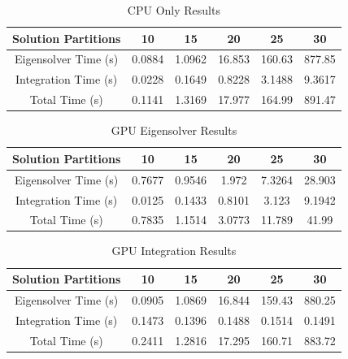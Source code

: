 \documentclass[conference, twoside]{IEEEtran}
\begin{document}

\begin{table}
    \renewcommand{\arraystretch}{1.3} %
    \caption{CPU Only Results}
    \label{cpu-only-results}
    \centering
    \begin{tabular}{c||c|c|c|c|c}
        \hline
        {Solution Partitions} & {10} & {15} & {20} & {25} & {30} \\
        \hline
        \hline
        {Eigensolver Time (s)}              & {0.0884} & {1.0962} & {16.853} & {160.63} & {877.85}\\
        {Integration Time (s)}              & {0.0228} & {0.1649} & {0.8228} & {3.1488} & {9.3617}\\
        {Total Time (s)}                    & {0.1141} & {1.3169} & {17.977} & {164.99} & {891.47}\\
        \hline
    \end{tabular}
\end{table}

\begin{table}
    \renewcommand{\arraystretch}{1.3} %
    \caption{GPU Eigensolver Results}
    \label{gpu-eigensolver-results}
    \centering
    \begin{tabular}{c||c|c|c|c|c}
        \hline
        {Solution Partitions} & {10} & {15} & {20} & {25} & {30} \\
        \hline
        \hline
        {Eigensolver Time (s)}              & {0.7677} & {0.9546} & {1.972}  & {7.3264} & {28.903}\\
        {Integration Time (s)}              & {0.0125} & {0.1433} & {0.8101} & {3.123}  & {9.1942}\\
        {Total Time (s)}                    & {0.7835} & {1.1514} & {3.0773} & {11.789} & {41.99} \\
        \hline
    \end{tabular}
\end{table}

\begin{table}
    \renewcommand{\arraystretch}{1.3} %
    \caption{GPU Integration Results}
    \label{gpu-integration-results}
    \centering
    \begin{tabular}{c||c|c|c|c|c}
        \hline
        {Solution Partitions} & {10} & {15} & {20} & {25} & {30} \\
        \hline
        \hline
        {Eigensolver Time (s)}              & {0.0905} & {1.0869} & {16.844} & {159.43} & {880.25}\\
        {Integration Time (s)}              & {0.1473} & {0.1396} & {0.1488} & {0.1514} & {0.1491}\\
        {Total Time (s)}                    & {0.2411} & {1.2816} & {17.295} & {160.71} & {883.72}\\
        \hline
    \end{tabular}
\end{table}
\end{document}
